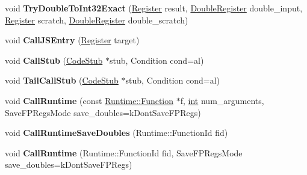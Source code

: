 \begin{DoxyCompactItemize}
void {\bfseries Try\+Double\+To\+Int32\+Exact} (\mbox{\hyperlink{classv8_1_1internal_1_1Register}{Register}} result, \mbox{\hyperlink{classv8_1_1internal_1_1DoubleRegister}{Double\+Register}} double\+\_\+input, \mbox{\hyperlink{classv8_1_1internal_1_1Register}{Register}} scratch, \mbox{\hyperlink{classv8_1_1internal_1_1DoubleRegister}{Double\+Register}} double\+\_\+scratch)
\item 
\mbox{\label{classv8_1_1internal_1_1MacroAssembler_a74c3a9f7c17e99334addf45c3dd17ff9}} 
void {\bfseries Call\+J\+S\+Entry} (\mbox{\hyperlink{classv8_1_1internal_1_1Register}{Register}} target)
\item 
\mbox{\label{classv8_1_1internal_1_1MacroAssembler_a7d21a7004bdf85665462d7dcc8216376}} 
void {\bfseries Call\+Stub} (\mbox{\hyperlink{classv8_1_1internal_1_1CodeStub}{Code\+Stub}} $\ast$stub, Condition cond=al)
\item 
\mbox{\label{classv8_1_1internal_1_1MacroAssembler_a2e979aa8359c6965ff35ab75551e4e9c}} 
void {\bfseries Tail\+Call\+Stub} (\mbox{\hyperlink{classv8_1_1internal_1_1CodeStub}{Code\+Stub}} $\ast$stub, Condition cond=al)
\item 
\mbox{\label{classv8_1_1internal_1_1MacroAssembler_a37081c297a4c533e549cc58167f7ccaa}} 
void {\bfseries Call\+Runtime} (const \mbox{\hyperlink{structv8_1_1internal_1_1Runtime_1_1Function}{Runtime\+::\+Function}} $\ast$f, \mbox{\hyperlink{classint}{int}} num\+\_\+arguments, Save\+F\+P\+Regs\+Mode save\+\_\+doubles=k\+Dont\+Save\+F\+P\+Regs)
\item 
\mbox{\label{classv8_1_1internal_1_1MacroAssembler_aee12672409bb962021b154936d5f0e45}} 
void {\bfseries Call\+Runtime\+Save\+Doubles} (Runtime\+::\+Function\+Id fid)
\item 
\mbox{\label{classv8_1_1internal_1_1MacroAssembler_a797b53d578cd762b40c56f4485bf584e}} 
void {\bfseries Call\+Runtime} (Runtime\+::\+Function\+Id fid, Save\+F\+P\+Regs\+Mode save\+\_\+doubles=k\+Dont\+Save\+F\+P\+Regs)
\item 
\mbox{\label{classv8_1_1internal_1_1MacroAssembler_a87a8fd8a93b463d8485753c6d0d0465e}} 

\end{DoxyCompactItemize}
